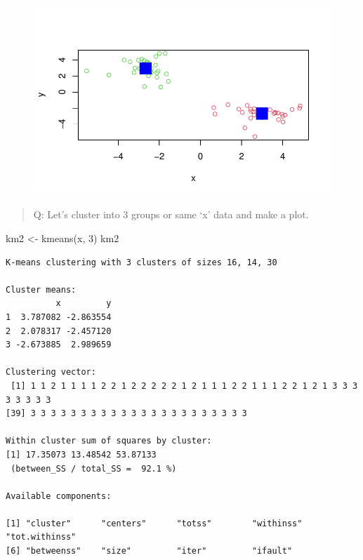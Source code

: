 \documentclass[
  letterpaper,
  DIV=11,
  numbers=noendperiod]{scrartcl}
\newenvironment{Shaded}{\begin{snugshade}}{\end{snugshade}}
\newcommand{\DecValTok}[1]{\textcolor[rgb]{0.68,0.00,0.00}{#1}}
\newcommand{\FunctionTok}[1]{\textcolor[rgb]{0.28,0.35,0.67}{#1}}
\newcommand{\NormalTok}[1]{\textcolor[rgb]{0.00,0.23,0.31}{#1}}
\newcommand{\OtherTok}[1]{\textcolor[rgb]{0.00,0.23,0.31}{#1}}
\begin{document}
\begin{figure}[H]

{\centering \includegraphics{Lab-7_files/figure-pdf/unnamed-chunk-9-1.pdf}

}

\end{figure}

\begin{quote}
Q: Let's cluster into 3 groups or same `x' data and make a plot.
\end{quote}

\begin{Shaded}
\begin{Highlighting}[]
\NormalTok{km2 }\OtherTok{\textless{}{-}} \FunctionTok{kmeans}\NormalTok{(x, }\DecValTok{3}\NormalTok{)}
\NormalTok{km2}
\end{Highlighting}
\end{Shaded}

\begin{verbatim}
K-means clustering with 3 clusters of sizes 16, 14, 30

Cluster means:
          x         y
1  3.787082 -2.863554
2  2.078317 -2.457120
3 -2.673885  2.989659

Clustering vector:
 [1] 1 1 2 1 1 1 1 2 2 1 2 2 2 2 2 1 2 1 1 1 2 2 1 1 1 2 2 1 2 1 3 3 3 3 3 3 3 3
[39] 3 3 3 3 3 3 3 3 3 3 3 3 3 3 3 3 3 3 3 3 3 3

Within cluster sum of squares by cluster:
[1] 17.35073 13.48542 53.87133
 (between_SS / total_SS =  92.1 %)

Available components:

[1] "cluster"      "centers"      "totss"        "withinss"     "tot.withinss"
[6] "betweenss"    "size"         "iter"         "ifault"      
\end{verbatim}
\end{document}
